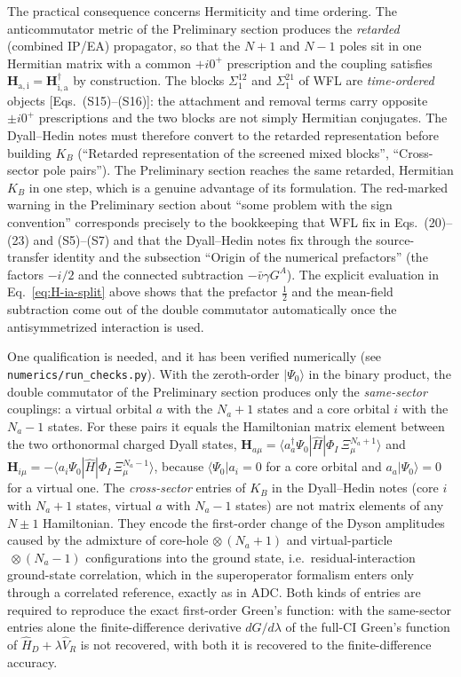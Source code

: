\documentclass[11pt,a4paper]{article}
\newcommand{\bH}{\boldsymbol{H}}
\newcommand{\ket}[1]{|#1\rangle}
\newcommand{\bra}[1]{\langle#1|}
\newcommand{\braket}[1]{\langle#1\rangle}
\newcommand{\WFL}{WFL}
\newcommand{\Pre}{Preliminary section}
\newcommand{\DHN}{Dyall--Hedin notes}
\begin{document}
The practical consequence concerns Hermiticity and time ordering.  The
anticommutator metric of the \Pre{} produces the \emph{retarded} (combined
IP/EA) propagator, so that the $N+1$ and $N-1$ poles sit in one Hermitian
matrix with a common $+i0^+$ prescription and the coupling satisfies
$\bH_{\mathrm{a,i}}=\bH_{\mathrm{i,a}}^\dagger$ by construction.  The blocks
$\Sigma_1^{12}$ and $\Sigma_1^{21}$ of \WFL{} are \emph{time-ordered} objects
[Eqs.~(S15)--(S16)]: the attachment and removal terms carry opposite
$\pm i0^+$ prescriptions and the two blocks are not simply Hermitian
conjugates.  The \DHN{} must therefore convert to the retarded representation
before building $K_B$ (``Retarded representation of the screened mixed blocks'',
``Cross-sector pole pairs'').  The \Pre{} reaches the same retarded, Hermitian
$K_B$ in one step, which is a genuine advantage of its formulation.  The
red-marked warning in the \Pre{} about ``some problem with the sign convention''
corresponds precisely to the bookkeeping that \WFL{} fix in Eqs.~(20)--(23)
and (S5)--(S7) and that the \DHN{} fix through the source-transfer identity and
the subsection ``Origin of the numerical prefactors'' (the factors $-i/2$ and
the connected subtraction $-\bar v\gamma G^A$).  The explicit evaluation in
Eq.~\eqref{eq:H-ia-split} above shows that the prefactor $\tfrac12$ and the
mean-field subtraction come out of the double commutator automatically once
the antisymmetrized interaction is used.

One qualification is needed, and it has been verified numerically (see
\texttt{numerics/run\_checks.py}).  With the zeroth-order $\ket{\Psi_0}$ in
the binary product, the double commutator of the \Pre{} produces only the
\emph{same-sector} couplings: a virtual orbital $a$ with the $N_a+1$ states
and a core orbital $i$ with the $N_a-1$ states.  For these pairs it equals the
Hamiltonian matrix element between the two orthonormal charged Dyall states,
$\bH_{a\mu}=\braket{a_a^\dagger\Psi_0|\hat H|\Phi_I\,\Xi_\mu^{N_a+1}}$ and
$\bH_{i\mu}=-\braket{a_i\Psi_0|\hat H|\Phi_I\,\Xi_\mu^{N_a-1}}$, because
$\bra{\Psi_0}a_i=0$ for a core orbital and $a_a\ket{\Psi_0}=0$ for a virtual
one.  The \emph{cross-sector} entries of $K_B$ in the \DHN{} (core $i$ with
$N_a+1$ states, virtual $a$ with $N_a-1$ states) are not matrix elements of
any $N\pm1$ Hamiltonian.  They encode the first-order change of the Dyson
amplitudes caused by the admixture of core-hole$\,\otimes(N_a+1)$ and
virtual-particle$\,\otimes(N_a-1)$ configurations into the ground state,
i.e.\ residual-interaction ground-state correlation, which in the
superoperator formalism enters only through a correlated reference, exactly
as in ADC.  Both kinds of entries are required to reproduce the exact
first-order Green's function: with the same-sector entries alone the
finite-difference derivative $dG/d\lambda$ of the full-CI Green's function of
$\hat H_D+\lambda\hat V_R$ is not recovered, with both it is recovered to the
finite-difference accuracy.
\end{document}
